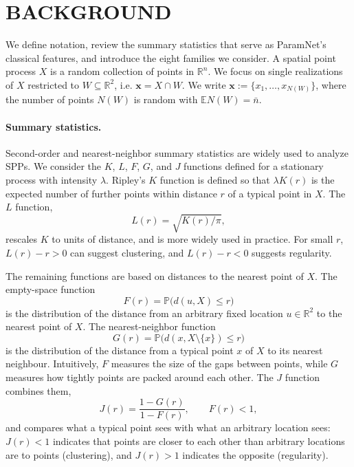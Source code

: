 \documentclass[twoside]{article}
\newcommand{\nb}{\bar n}
\newcommand{\pc}{\mathbf{x}}
\begin{document}

\section{BACKGROUND}
\label{sec:setting}
\label{sec:spp}

We define notation, review the summary statistics that serve as ParamNet's classical features, and introduce the eight families we consider.
A spatial point process $X$ is a random collection of points in $\mathbb{R}^n$. We focus on single realizations of $X$ restricted to $W \subseteq \mathbb{R}^2$, i.e. $\pc = X \cap W$. We write $\pc := \{x_1, \dots, x_{N(W)}\}$, where the number of points $N(W)$ is random with $\mathbb{E}N(W) = \nb$.

\paragraph{Summary statistics.}
Second-order and nearest-neighbor summary statistics are widely used to analyze SPPs. We consider the $K$, $L$, $F$, $G$, and $J$ functions defined for a stationary process with intensity $\lambda$. Ripley's $K$
function is defined so that $\lambda K(r)$ is the expected number of further points within distance $r$ of a typical
point in $X$. The $L$ function,
\[
  L(r)=\sqrt{K(r)/\pi},
\]
rescales $K$ to units of distance, and is more widely used in practice. For small $r$, $L(r) - r > 0$ can suggest clustering, and  $L(r) - r < 0$ suggests regularity.

The remaining functions are based on distances to the nearest point of $X$. The empty-space function
\[
  F(r)=\mathbb{P}\bigl(d(u,X)\le r\bigr)
\]
is the distribution of the distance from an arbitrary fixed location
$u\in\mathbb{R}^2$ to the nearest point of $X$. The nearest-neighbor function
\[
  G(r)=\mathbb{P}\bigl(d(x,X\setminus\{x\})\le r\bigr)
\]
is the distribution of the distance from a typical point $x$ of
$X$ to its nearest neighbour. Intuitively, $F$ measures the size of the gaps between points, while $G$ measures how
tightly points are packed around each other. The $J$ function combines them,
\[
  J(r)=\frac{1-G(r)}{1-F(r)}, \qquad F(r)<1,
\]
and compares what a typical point sees with what an arbitrary location sees: $J(r)<1$ indicates that points are closer
to each other than arbitrary locations are to points (clustering), and $J(r)>1$ indicates the opposite (regularity).
\end{document}
